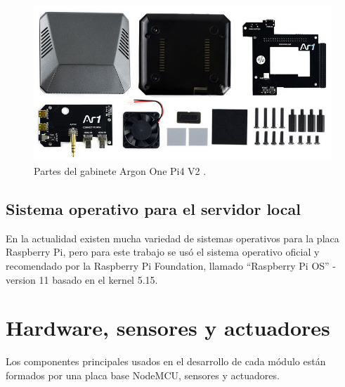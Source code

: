 \begin{figure}[htpb]
\centering 
\includegraphics[width=1.0\textwidth]{./Figures/argon2.jpg}
\caption{Partes del gabinete Argon One Pi4 V2 \protect\footnotemark.}
\label{fig:armado}
\end{figure}

\subsection{Sistema operativo para el servidor local}

En la actualidad existen mucha variedad de sistemas operativos para la placa Raspberry Pi, pero para este trabajo se usó el sistema operativo oficial y recomendado por la Raspberry Pi Foundation, llamado ``Raspberry Pi OS'' - version 11 basado en el kernel 5.15.


\section{Hardware, sensores y actuadores}

Los componentes principales usados en el desarrollo de cada módulo están formados por una placa base NodeMCU, sensores y actuadores.

